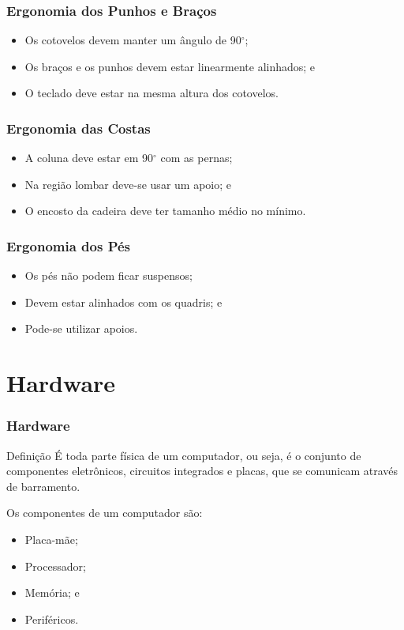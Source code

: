 \documentclass[aspectratio=169]{beamer} %
\begin{document}
\begin{frame}
	\frametitle{Ergonomia dos Punhos e Braços}
	
	\begin{itemize}
		\item Os cotovelos devem manter um ângulo de 90$^{\circ}$;
		\item Os braços e os punhos devem estar linearmente alinhados; e
		\item O teclado deve estar na mesma altura dos cotovelos.
	\end{itemize}
\end{frame}

\begin{frame}
	\frametitle{Ergonomia das Costas}
	
	\begin{itemize}
		\item A coluna deve estar em 90$^{\circ}$ com as pernas;
		\item Na região lombar deve-se usar um apoio; e
		\item O encosto da cadeira deve ter tamanho médio no mínimo.
	\end{itemize}
\end{frame}

\begin{frame}
	\frametitle{Ergonomia dos Pés}
	
	\begin{itemize}
		\item Os pés não podem ficar suspensos;
		\item Devem estar alinhados com os quadris; e
		\item Pode-se utilizar apoios. 
	\end{itemize}
\end{frame}

\section{Hardware}

\begin{frame}
	\frametitle{Hardware}
	
	\begin{block}{Defini\c cão}
		É toda parte física de um computador, ou seja, é o conjunto de componentes eletrônicos, circuitos integrados e placas, que se comunicam através de barramento.
	\end{block}\vfill
	
	Os componentes de um computador são:
	\begin{itemize}
		\item Placa-mãe;
		\item Processador;
		\item Memória; e
		\item Periféricos.
	\end{itemize}\
\end{frame}
\end{document}
